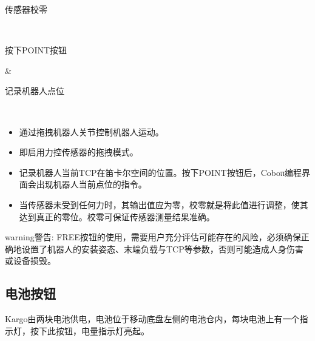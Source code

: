 \documentclass[a4paper,11pt,english,openany,oneside]{sphinxmanual}
\begin{document}
\begin{savenotes}
\begin{tabular}[t]{}
\begin{varwidth}[t]{}
\sphinxAtStartPar
传感器校零
\sphinxbeforeendvarwidth
\end{varwidth}%
\\
\sphinxhline\begin{varwidth}[t]{}
\sphinxAtStartPar
按下POINT按钮
\sphinxbeforeendvarwidth
\end{varwidth}%
&\begin{varwidth}[t]{}
\sphinxAtStartPar
记录机器人点位
\sphinxbeforeendvarwidth
\end{varwidth}%
\\
\sphinxbottomrule
\end{tabular}
\sphinxtableafterendhook\par
\sphinxattableend\end{savenotes}
\begin{itemize}
\item {} 
\sphinxAtStartPar
{} 通过拖拽机器人关节控制机器人运动。

\item {} 
\sphinxAtStartPar
{} 即启用力控传感器的拖拽模式。

\item {} 
\sphinxAtStartPar
{} 记录机器人当前TCP在笛卡尔空间的位置。按下POINT按钮后，Coboπ编程界面会出现机器人当前点位的指令。

\item {} 
\sphinxAtStartPar
{} 当传感器未受到任何力时，其输出值应为零，校零就是将此值进行调整，使其达到真正的零位。校零可保证传感器测量结果准确。

\end{itemize}

\begin{sphinxadmonition}{warning}{警告:}
\sphinxAtStartPar
FREE按钮的使用，需要用户充分评估可能存在的风险，必须确保正确地设置了机器人的安装姿态、末端负载与TCP等参数，否则可能造成人身伤害或设备损毁。
\end{sphinxadmonition}


\subsection{电池按钮}
\label{\detokenize{07 _u6280_u672f_u89c4_u683c:id28}}\label{\detokenize{07 _u6280_u672f_u89c4_u683c:id29}}
\sphinxAtStartPar
Kargo由两块电池供电，电池位于移动底盘左侧的电池仓内，每块电池上有一个指示灯，按下此按钮，电量指示灯亮起。
\end{document}
